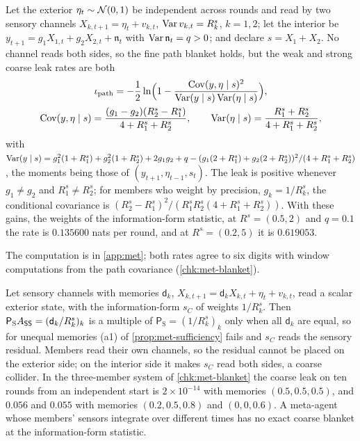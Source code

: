 \begin{example}\label{ex:met-summary-leak}
Let the exterior $\eta_t\sim\mathcal{N}(0,1)$ be independent across rounds and read by two sensory channels $X_{k,t+1}=\eta_t+v_{k,t}$, $\operatorname{Var} v_{k,t}=R^s_k$, $k=1,2$; let the interior be $y_{t+1}=g_1X_{1,t}+g_2X_{2,t}+\mathfrak n_t$ with $\operatorname{Var}\mathfrak n_t=q>0$; and declare $s=X_1+X_2$. No channel reads both sides, so the fine path blanket holds, but the weak and strong coarse leak rates are both
\begin{equation}\label{eq:met-summary-leak}
\begin{gathered}
\iota_{\mathrm{path}}=-\frac12\ln\Bigl(1-\frac{\operatorname{Cov}(y,\eta\mid s)^2}{\operatorname{Var}(y\mid s)\operatorname{Var}(\eta\mid s)}\Bigr),\\
\operatorname{Cov}(y,\eta\mid s)=\frac{(g_1-g_2)(R^s_2-R^s_1)}{4+R^s_1+R^s_2},\qquad\operatorname{Var}(\eta\mid s)=\frac{R^s_1+R^s_2}{4+R^s_1+R^s_2},
\end{gathered}
\end{equation}
with $\operatorname{Var}(y\mid s)=g_1^2(1+R^s_1)+g_2^2(1+R^s_2)+2g_1g_2+q-(g_1(2+R^s_1)+g_2(2+R^s_2))^2/(4+R^s_1+R^s_2)$, the moments being those of $(y_{t+1},\eta_{t-1},s_t)$. The leak is positive whenever $g_1\neq g_2$ and $R^s_1\neq R^s_2$; for members who weight by precision, $g_k=1/R^s_k$, the conditional covariance is $(R^s_2-R^s_1)^2/(R^s_1R^s_2(4+R^s_1+R^s_2))$. With these gains, the weights of the information-form statistic, at $R^s=(0.5,2)$ and $q=0.1$ the rate is $0.135600$ nats per round, and at $R^s=(0.2,5)$ it is $0.619053$.
\end{example}
The computation is in \cref{app:met}; both rates agree to six digits with window computations from the path covariance (\cref{chk:met-blanket}).

\begin{example}\label{ex:met-channel-memory}
Let sensory channels with memories $\mathsf d_k$, $X_{k,t+1}=\mathsf d_kX_{k,t}+\eta_t+v_{k,t}$, read a scalar exterior state, with the information-form $s_C$ of weights $1/R^s_k$. Then $\mathsf P_{\mathrm S}A_{\mathsf{S}\mathsf{S}}=(\mathsf d_k/R^s_k)_k$ is a multiple of $\mathsf P_{\mathrm S}=(1/R^s_k)_k$ only when all $\mathsf d_k$ are equal, so for unequal memories (a1) of \cref{prop:met-sufficiency} fails and $s_C$ reads the sensory residual. Members read their own channels, so the residual cannot be placed on the exterior side; on the interior side it makes $s_C$ read both sides, a coarse collider. In the three-member system of \cref{chk:met-blanket} the coarse leak on ten rounds from an independent start is $2\times10^{-14}$ with memories $(0.5,0.5,0.5)$, and $0.056$ and $0.055$ with memories $(0.2,0.5,0.8)$ and $(0,0,0.6)$. A meta-agent whose members' sensors integrate over different times has no exact coarse blanket at the information-form statistic.
\end{example}

